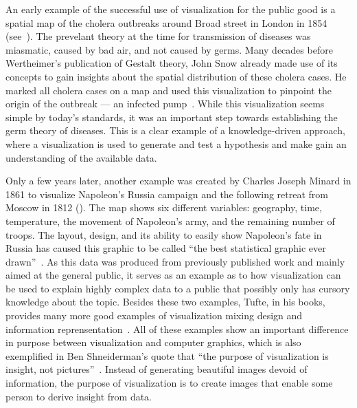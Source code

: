 An early example of the successful use of visualization for the public good is a spatial map of the cholera outbreaks around Broad street in London in 1854 (see~).  The prevelant theory at the time for transmission of diseases was miasmatic, caused by bad air, and not caused by germs.  Many decades before Wertheimer's publication of Gestalt theory, John Snow already made use of its concepts to gain insights about the spatial distribution of these cholera cases.  He marked all cholera cases on a map and used this visualization to pinpoint the origin of the outbreak --- an infected pump~\cite{snow1855mode}.  While this visualization seems simple by today's standards, it was an important step towards establishing the germ theory of diseases.  This is a clear example of a knowledge-driven approach, where a visualization is used to generate and test a hypothesis and make gain an understanding of the available data.

Only a few years later, another example was created by Charles Joseph Minard in 1861 to visualize Napoleon's Russia campaign and the following retreat from Moscow in 1812 ().  The map shows six different variables: geography, time, temperature, the movement of Napoleon’s army, and the remaining number of troops.  The layout, design, and its ability to easily show Napoleon's fate in Russia has caused this graphic to be called ``the best statistical graphic ever drawn''~\cite{tufte1983visual}.  As this data was produced from previously published work and mainly aimed at the general public, it serves as an example as to how visualization can be used to explain highly complex data to a public that possibly only has cursory knowledge about the topic.  Besides these two examples, Tufte, in his books, provides many more good examples of visualization mixing design and information reprensentation~\cite{tufte1991envisioning}.  All of these examples show an important difference in purpose between visualization and computer graphics, which is also exemplified in Ben Shneiderman's quote that ``the purpose of visualization is insight, not pictures''~\cite{card1999readings}.  Instead of generating beautiful images devoid of information, the purpose of visualization is to create images that enable some person to derive insight from data.

